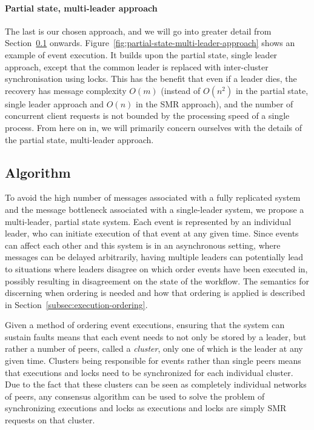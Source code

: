 \documentclass{article}
\begin{document}
	\paragraph{Partial state, multi-leader approach}
	The last is our chosen approach, and we will go into greater detail from Section~\ref{subsec:algorithm} onwards.
	Figure~\ref{fig:partial-state-multi-leader-approach} shows an example of event execution.
	It builds upon the partial state, single leader approach, except that the common leader is replaced with inter-cluster synchronisation using locks.
	This has the benefit that even if a leader dies, the recovery has message complexity $O(m)$ (instead of $O(n^2)$ in the partial state, single leader approach and $O(n)$ in the SMR approach), and the number of concurrent client requests is not bounded by the processing speed of a single process.
	From here on in, we will primarily concern ourselves with the details of the partial state, multi-leader approach.

	\subsection{Algorithm}
	\label{subsec:algorithm}

	To avoid the high number of messages associated with a fully replicated system and the message bottleneck associated with a single-leader system, we propose a multi-leader, partial state system.
	Each event is represented by an individual leader, who can initiate execution of that event at any given time.
	Since events can affect each other and this system is in an asynchronous setting, where messages can be delayed arbitrarily, having multiple leaders can potentially lead to situations where leaders disagree on which order events have been executed in, possibly resulting in disagreement on the state of the workflow.
	The semantics for discerning when ordering is needed and how that ordering is applied is described in Section~\ref{subsec:execution-ordering}.

	Given a method of ordering event executions, ensuring that the system can sustain faults means that each event needs to not only be stored by a leader, but rather a number of peers, called a \textit{cluster}, only one of which is the leader at any given time.
	Clusters being responsible for events rather than single peers means that executions and locks need to be synchronized for each individual cluster.
	Due to the fact that these clusters can be seen as completely individual networks of peers, any consensus algorithm can be used to solve the problem of synchronizing executions and locks as executions and locks are simply SMR requests on that cluster.
\end{document}
